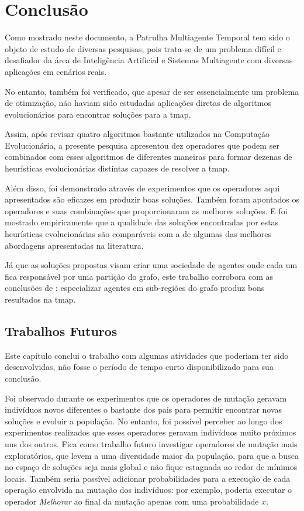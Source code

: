 \chapter{Conclusão}
\label{conclusao_final}

Como mostrado neste documento, a Patrulha Multiagente Temporal tem sido o objeto 
de estudo de diversas pesquisas, pois trata-se de um problema difícil e 
desafiador da área de Inteligência Artificial e Sistemas Multiagente com 
diversas aplicações em cenários reais.

No entanto, também foi verificado, que apesar de ser essencialmente um problema 
de otimização, não haviam sido estudadas aplicações diretas de algoritmos 
evolucionários para encontrar soluções para a \ac{tmap}.

Assim, após revisar quatro algoritmos bastante utilizados na Computação 
Evolucionária, a presente pesquisa apresentou dez operadores que podem ser 
combinados com esses algoritmos de diferentes maneiras para formar dezenas de 
heurísticas evolucionárias distintas capazes de resolver a \ac{tmap}.

Além disso, foi demonstrado através de experimentos que os operadores aqui 
apresentados são eficazes em produzir boas soluções. Também foram apontados 
os operadores e suas combinações que proporcionaram as melhores soluções. 
E foi mostrado empiricamente que a qualidade das soluções encontradas por estas 
heurísticas evolucionárias são comparáveis com a de algumas das melhores 
abordagens apresentadas na literatura.

Já que as soluções propostas visam criar uma sociedade de agentes onde cada um 
fica responsável por uma partição do grafo, este trabalho corrobora com as 
conclusões de \citep{1373634}: especializar agentes em sub-regiões do grafo 
produz bons resultados na \ac{tmap}.

\section{Trabalhos Futuros}

Este capítulo conclui o trabalho com algumas atividades que poderiam ter sido 
desenvolvidas, não fosse o período de tempo curto disponibilizado para sua 
conclusão.

Foi observado durante os experimentos que os operadores de mutação geravam 
indivíduos novos diferentes o bastante dos pais para permitir encontrar novas 
soluções e evoluir a população. No entanto, foi possível perceber ao longo dos 
experimentos realizados que esses operadores geravam indivíduos muito próximos 
uns dos outros. Fica como trabalho futuro investigar operadores de mutação mais 
exploratórios, que levem a uma diversidade maior da população, para que a busca 
no espaço de soluções seja mais global e não fique estagnada ao redor de mínimos 
locais. Também seria possível adicionar probabilidades para a execução de cada 
operação envolvida na mutação dos indivíduos: por exemplo, poderia executar o 
operador \textit{Melhorar} ao final da mutação apenas com uma probabilidade $x$.

